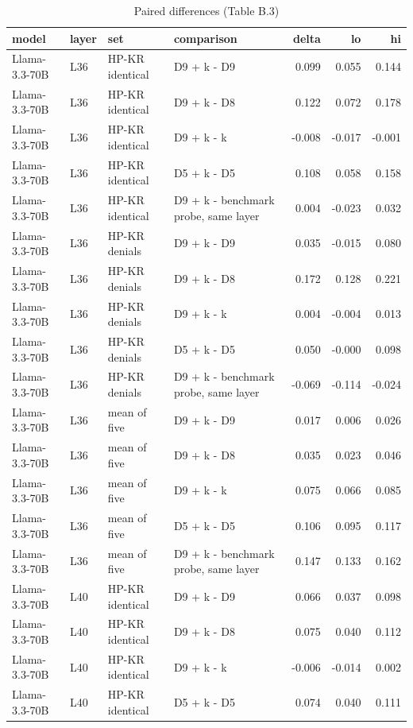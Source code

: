 \begin{table}
\caption{Paired differences (Table B.3)}
\label{tab:x-paired}
\begin{tabular}{llllrrr}
\toprule
model & layer & set & comparison & delta & lo & hi \\
\midrule
Llama-3.3-70B & L36 & HP-KR identical & D9 + k - D9 & 0.099 & 0.055 & 0.144 \\
Llama-3.3-70B & L36 & HP-KR identical & D9 + k - D8 & 0.122 & 0.072 & 0.178 \\
Llama-3.3-70B & L36 & HP-KR identical & D9 + k - k & -0.008 & -0.017 & -0.001 \\
Llama-3.3-70B & L36 & HP-KR identical & D5 + k - D5 & 0.108 & 0.058 & 0.158 \\
Llama-3.3-70B & L36 & HP-KR identical & D9 + k - benchmark probe, same layer & 0.004 & -0.023 & 0.032 \\
Llama-3.3-70B & L36 & HP-KR denials & D9 + k - D9 & 0.035 & -0.015 & 0.080 \\
Llama-3.3-70B & L36 & HP-KR denials & D9 + k - D8 & 0.172 & 0.128 & 0.221 \\
Llama-3.3-70B & L36 & HP-KR denials & D9 + k - k & 0.004 & -0.004 & 0.013 \\
Llama-3.3-70B & L36 & HP-KR denials & D5 + k - D5 & 0.050 & -0.000 & 0.098 \\
Llama-3.3-70B & L36 & HP-KR denials & D9 + k - benchmark probe, same layer & -0.069 & -0.114 & -0.024 \\
Llama-3.3-70B & L36 & mean of five & D9 + k - D9 & 0.017 & 0.006 & 0.026 \\
Llama-3.3-70B & L36 & mean of five & D9 + k - D8 & 0.035 & 0.023 & 0.046 \\
Llama-3.3-70B & L36 & mean of five & D9 + k - k & 0.075 & 0.066 & 0.085 \\
Llama-3.3-70B & L36 & mean of five & D5 + k - D5 & 0.106 & 0.095 & 0.117 \\
Llama-3.3-70B & L36 & mean of five & D9 + k - benchmark probe, same layer & 0.147 & 0.133 & 0.162 \\
Llama-3.3-70B & L40 & HP-KR identical & D9 + k - D9 & 0.066 & 0.037 & 0.098 \\
Llama-3.3-70B & L40 & HP-KR identical & D9 + k - D8 & 0.075 & 0.040 & 0.112 \\
Llama-3.3-70B & L40 & HP-KR identical & D9 + k - k & -0.006 & -0.014 & 0.002 \\
Llama-3.3-70B & L40 & HP-KR identical & D5 + k - D5 & 0.074 & 0.040 & 0.111 \\

\end{tabular}
\end{table}
